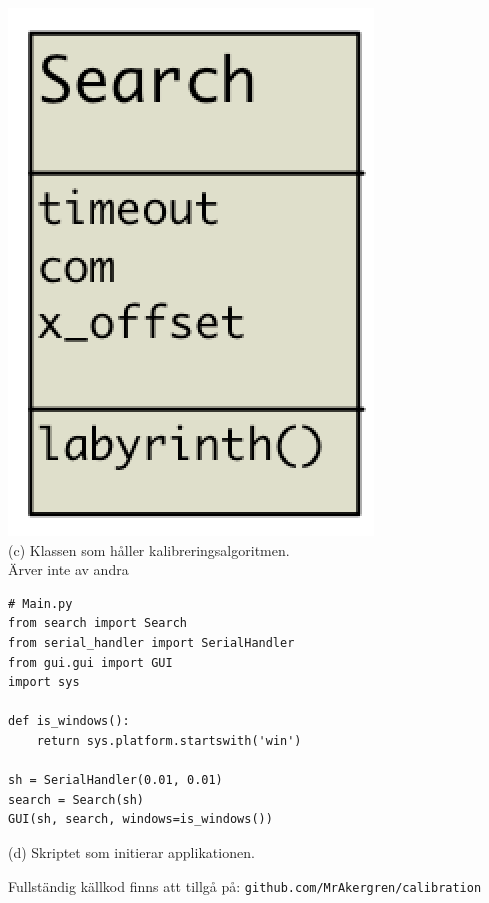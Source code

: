 \begin{minipage}[l]{0.49\textwidth}
    \vspace*{2em}
    \centering
        \includegraphics[scale=0.25]{res/img/search_uml} \\
        \vspace*{3.7em}
        (c) Klassen som håller kalibreringsalgoritmen. \\ Ärver inte av andra
\end{minipage}
\begin{minipage}[l]{0.49\textwidth}
    \vspace{-3.5em}
        \begin{verbatim}
# Main.py
from search import Search
from serial_handler import SerialHandler
from gui.gui import GUI
import sys

def is_windows():
    return sys.platform.startswith('win')

sh = SerialHandler(0.01, 0.01)
search = Search(sh)
GUI(sh, search, windows=is_windows())
\end{verbatim}
        \centering
        (d) Skriptet som initierar applikationen.
\end{minipage}

\vfill
\begin{center}
Fullständig källkod finns att tillgå på: \texttt{github.com/MrAkergren/calibration}
\end{center}

